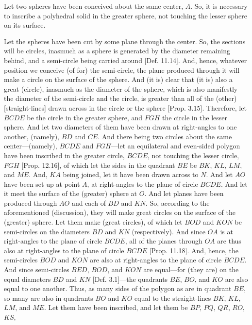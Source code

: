 \begin{Parallel}{}{}
{Let two spheres have been conceived about the same center, $A$. So, it is necessary to inscribe a polyhedral solid in the greater
sphere, not touching the lesser sphere on its surface.

Let the spheres have been cut by some plane through the center. So, the sections will be circles, inasmuch as a sphere is generated by  the diameter remaining behind,
and a semi-circle being carried around [Def. 11.14]. And, hence,  whatever position we
conceive  (of for) the semi-circle, the  plane produced through it will  make a circle on the surface of the sphere. And (it is) clear
that (it is) also a great (circle), inasmuch as the diameter of the sphere, which is also manifestly the  diameter of  the semi-circle
and the circle, is greater than  all of the (other)  [straight-lines] drawn across in the circle or the sphere [Prop. 3.15]. Therefore, let $BCDE$ be the circle in the greater sphere, and $FGH$ the circle in the lesser sphere. And let two diameters of them have been drawn
at right-angles to one another, (namely), $BD$ and $CE$. And there being two circles about the same center---(namely), $BCDE$
and $FGH$---let an equilateral and even-sided polygon have been inscribed in the greater circle, $BCDE$, not touching the
lesser circle, $FGH$ [Prop. 12.16], of which let the sides in the quadrant $BE$ be
$BK$, $KL$, $LM$, and $ME$. And, $KA$ being joined, let it have been drawn across to $N$. And let $AO$ have been
set up at point $A$, at right-angles to the plane of circle $BCDE$. And let it meet the surface of the (greater) sphere at $O$. 
And let planes have been produced through  $AO$ and each of $BD$  and $KN$. So, according to the aforementioned (discussion),
they will make great circles on the surface of the (greater) sphere. Let them make (great circles), of which let $BOD$ and $KON$
be semi-circles on the diameters $BD$ and $KN$ (respectively). And since $OA$ is at right-angles
to the plane of circle $BCDE$,  all of the planes through $OA$ are thus also at right-angles to the plane of circle $BCDE$
[Prop. 11.18]. And, hence, the semi-circles $BOD$ and $KON$ are also at right-angles to the
plane of circle $BCDE$. And since semi-circles $BED$, $BOD$, and $KON$ are equal---for (they are) on the
equal diameters $BD$ and $KN$ [Def. 3.1]---the quadrants $BE$, $BO$, and $KO$ are also equal to one another. Thus, as many
sides of the polygon as are in quadrant $BE$, so many are also in quadrants $BO$ and $KO$ equal to the straight-lines
$BK$, $KL$, $LM$, and $ME$. Let them have been inscribed, and let them be $BP$, $PQ$, $QR$, $RO$, $KS$,
}
\end{Parallel}
